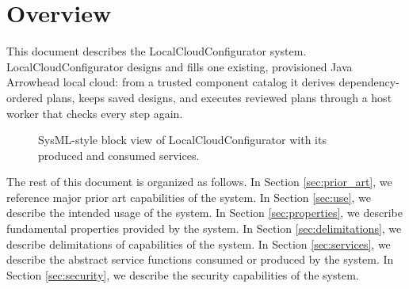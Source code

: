 \documentclass[a4paper]{arrowhead}
\begin{document}
\section{Overview}
\label{sec:overview}

This document describes the LocalCloudConfigurator system. LocalCloudConfigurator designs and fills one existing, provisioned Java Arrowhead local cloud: from a trusted component catalog it derives dependency-ordered plans, keeps saved designs, and executes reviewed plans through a host worker that checks every step again.

\begin{figure}[ht!]
  \centering
  \caption{SysML-style block view of LocalCloudConfigurator with its produced and consumed services.}
  \label{fig:system}
\end{figure}

The rest of this document is organized as follows.
In Section \ref{sec:prior_art}, we reference major prior art capabilities of the system.
In Section \ref{sec:use}, we describe the intended usage of the system.
In Section \ref{sec:properties}, we describe fundamental properties provided by the system.
In Section \ref{sec:delimitations}, we describe delimitations of capabilities of the system.
In Section \ref{sec:services}, we describe the abstract service functions consumed or produced by the system.
In Section \ref{sec:security}, we describe the security capabilities of the system.
\end{document}
